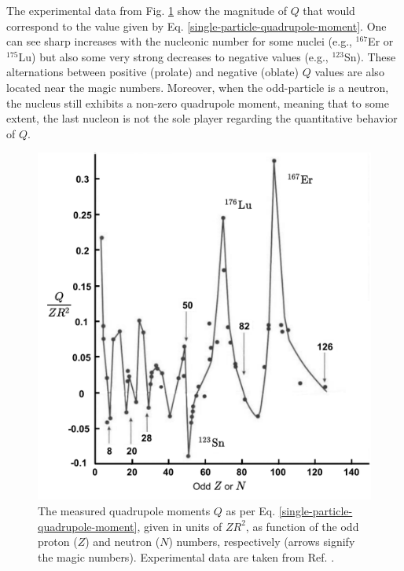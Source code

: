 The experimental data from Fig. \ref{experimental-Q-odd-nuclei} show the magnitude of $Q$ that would correspond to the value given by Eq. \ref{single-particle-quadrupole-moment}. One can see sharp increases with the nucleonic number for some nuclei (e.g., $^{167}$Er or $^{175}$Lu) but also some very strong decreases to negative values (e.g., $^{123}$Sn). These alternations between positive (prolate) and negative (oblate) $Q$ values are also located near the magic numbers. Moreover, when the odd-particle is a neutron, the nucleus still exhibits a non-zero quadrupole moment, meaning that to some extent, the last nucleon is not the sole player regarding the quantitative behavior of $Q$.
\begin{figure}
    \centering
    \includegraphics[scale=0.55]{Chapters/Figures/Exp_quadrupoleMoments.pdf}
    \caption{The measured quadrupole moments $Q$ as per Eq. \ref{single-particle-quadrupole-moment}, given in units of $ZR^2$, as function of the odd proton ($Z$) and neutron ($N$) numbers, respectively (arrows signify the magic numbers). Experimental data are taken from Ref. \cite{bertulani2007nuclear}.}
    \label{experimental-Q-odd-nuclei}
\end{figure}

